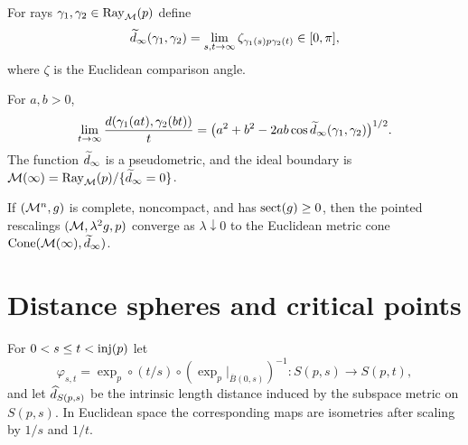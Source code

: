 \begin{definition}
\label{def:chow-iii-i27-ideal-angle}
For rays $\gamma_1,\gamma_2\in\operatorname{Ray}_{\mathcal M}(p)$ define
\[
\widetilde d_\infty(\gamma_1,\gamma_2)=\lim_{s,t\to\infty}
\zeta_{\gamma_1(s)p\gamma_2(t)}\in[0,\pi],
\]
where $\zeta$ is the Euclidean comparison angle.
\end{definition}

\begin{lemma}
\label{lem:chow-iii-i27-pseudometric}
For $a,b>0$,
\[
\lim_{t\to\infty}\frac{d(\gamma_1(at),\gamma_2(bt))}{t}
=\bigl(a^2+b^2-2ab\cos\widetilde d_\infty(\gamma_1,\gamma_2)\bigr)^{1/2}.
\]
The function $\widetilde d_\infty$ is a pseudometric, and the ideal boundary is
$\mathcal M(\infty)=\operatorname{Ray}_{\mathcal M}(p)/\{\widetilde d_\infty=0\}$.
\end{lemma}

\begin{theorem}
\label{thm:chow-iii-i26-asymptotic-cone}
If $(\mathcal M^n,g)$ is complete, noncompact, and has $\operatorname{sect}(g)\ge0$, then the
pointed rescalings $(\mathcal M,\lambda^2g,p)$ converge as $\lambda\downarrow0$ to the
Euclidean metric cone $\operatorname{Cone}(\mathcal M(\infty),\widetilde d_\infty)$.
\end{theorem}

\section{Distance spheres and critical points}

\begin{definition}
\label{def:chow-iii-i28-sphere-maps}
For $0<s\le t<\operatorname{inj}(p)$ let
\[
\varphi_{s,t}=\exp_p\circ(t/s)\circ(\exp_p|_{\overline B(0,s)})^{-1}:S(p,s)\to S(p,t),
\]
and let $\widehat d_{S(p,s)}$ be the intrinsic length distance induced by the
subspace metric on $S(p,s)$.  In Euclidean space the corresponding maps are
isometries after scaling by $1/s$ and $1/t$.
\end{definition}

